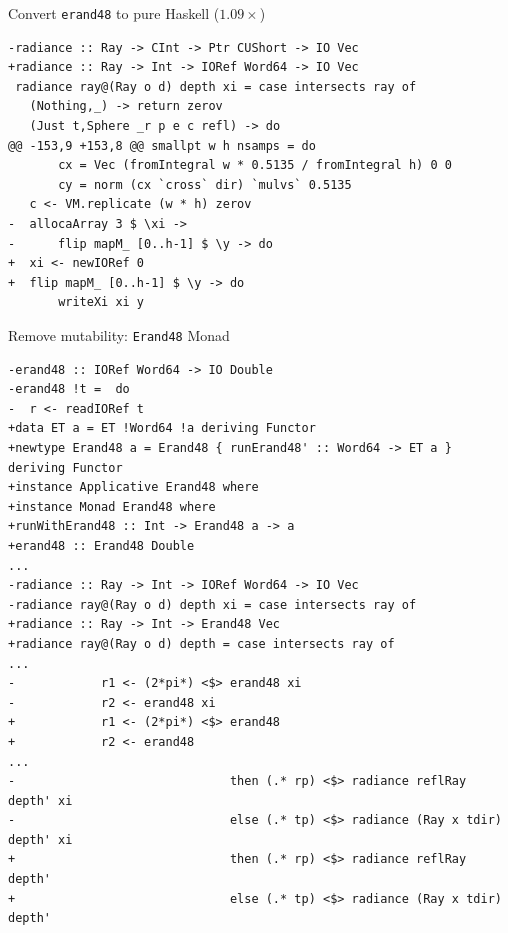 \documentclass[8pt]{beamer}
\begin{document}
\begin{frame}[fragile]{Convert \texttt{erand48} to pure Haskell ($1.09\times$)}
\begin{verbatim}
-radiance :: Ray -> CInt -> Ptr CUShort -> IO Vec
+radiance :: Ray -> Int -> IORef Word64 -> IO Vec
 radiance ray@(Ray o d) depth xi = case intersects ray of
   (Nothing,_) -> return zerov
   (Just t,Sphere _r p e c refl) -> do
@@ -153,9 +153,8 @@ smallpt w h nsamps = do
       cx = Vec (fromIntegral w * 0.5135 / fromIntegral h) 0 0
       cy = norm (cx `cross` dir) `mulvs` 0.5135
   c <- VM.replicate (w * h) zerov
-  allocaArray 3 $ \xi ->
-      flip mapM_ [0..h-1] $ \y -> do
+  xi <- newIORef 0
+  flip mapM_ [0..h-1] $ \y -> do
       writeXi xi y
\end{verbatim}
\end{frame}


\begin{frame}[fragile]{Remove mutability: \texttt{Erand48} Monad}


\begin{verbatim}
-erand48 :: IORef Word64 -> IO Double
-erand48 !t =  do
-  r <- readIORef t
+data ET a = ET !Word64 !a deriving Functor
+newtype Erand48 a = Erand48 { runErand48' :: Word64 -> ET a } deriving Functor
+instance Applicative Erand48 where
+instance Monad Erand48 where
+runWithErand48 :: Int -> Erand48 a -> a                                                                                                
+erand48 :: Erand48 Double
...
-radiance :: Ray -> Int -> IORef Word64 -> IO Vec
-radiance ray@(Ray o d) depth xi = case intersects ray of
+radiance :: Ray -> Int -> Erand48 Vec
+radiance ray@(Ray o d) depth = case intersects ray of
...
-            r1 <- (2*pi*) <$> erand48 xi
-            r2 <- erand48 xi
+            r1 <- (2*pi*) <$> erand48
+            r2 <- erand48
...
-                              then (.* rp) <$> radiance reflRay depth' xi
-                              else (.* tp) <$> radiance (Ray x tdir) depth' xi
+                              then (.* rp) <$> radiance reflRay depth'
+                              else (.* tp) <$> radiance (Ray x tdir) depth'
\end{verbatim}
\end{frame}

\end{document}
